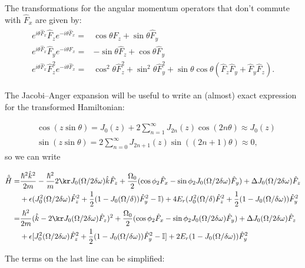 The transformations for the angular momentum operators that don't commute with $\hat{F}_x$ are given by: 
%
\begin{align}
\begin{split}
e^{i\theta \hat{F}_x} \hat{F}_z e^{-i\theta \hat{F}_x}=& \cos\theta \hat{F}_z + \sin\theta\hat{F}_y \\
e^{i\theta \hat{F}_x} \hat{F}_y e^{-i\theta \hat{F}_x} =& -\sin\theta\hat{F}_z +\cos\theta\hat{F}_y \\
e^{i\theta \hat{F}_x} \hat{F}_z^2 e^{-i\theta \hat{F}_x} = &\cos^2\theta\hat{F}_z^2+\sin^2\theta\hat{F}_y^2 + \sin\theta\cos\theta(\hat{F}_z\hat{F}_y + \hat{F}_y\hat{F}_z).
\end{split}
\end{align}

The Jacobi–Anger expansion will be useful to write an (almost) exact expression for the transformed Hamiltonian:

\begin{align}
&\cos(z\sin\theta)= J_0(z) + 2\sum_{n=1}^{\infty}J_{2n}(z)\cos(2n\theta) \approx J_0(z) \\
&\sin(z\sin\theta)= 2\sum_{n=0}^{\infty}J_{2n+1}(z)\sin((2n+1)\theta) \approx 0,
\end{align} 
%
%
so we can write

\begin{align}
\begin{split}
\hat{\tilde{H}} = &\frac{\hbar^2\hat{k}^2}{2m} - \frac{\hbar^2}{m}2\kr J_0(\Omega/2\delta\omega)\hat{k}\hat{F}_z + \frac{\Omega_0}{2}(\cos\phi_2\hat{F}_x - \sin\phi_2J_0(\Omega/2\delta\omega)\hat{F}_y)+ \Delta J_0(\Omega/2\delta\omega)\hat{F}_z \\
&+\epsilon(J_0^2(\Omega/2\delta\omega)\hat{F}_z^2 + \frac{1}{2}(1-J_0(\Omega/\delta))\hat{F}_y^2-\mathbb{I})+4E_r(J_0^2(\Omega/\delta)\hat{F}_z^2 + \frac{1}{2}(1-J_0(\Omega/\delta\omega))\hat{F}_y^2\\
= & \frac{\hbar^2}{2m}(\hat{k}-2\kr J_0(\Omega/2\delta\omega)\hat{F}_z)^2 +\frac{\Omega_0}{2}(\cos\phi_2\hat{F}_x - \sin\phi_2J_0(\Omega/2\delta\omega)\hat{F}_y) + \Delta J_0(\Omega/2\delta\omega)\hat{F}_z \\
& + \epsilon[J_0^2(\Omega/2\delta\omega)\hat{F}_z^2 + \frac{1}{2}(1-J_0(\Omega/\delta\omega))\hat{F}_y^2-\mathbb{I}]+2E_r (1-J_0(\Omega/\delta\omega))\hat{F}_y^2
\end{split}
\end{align}


The terms on the last line can be simplified:

